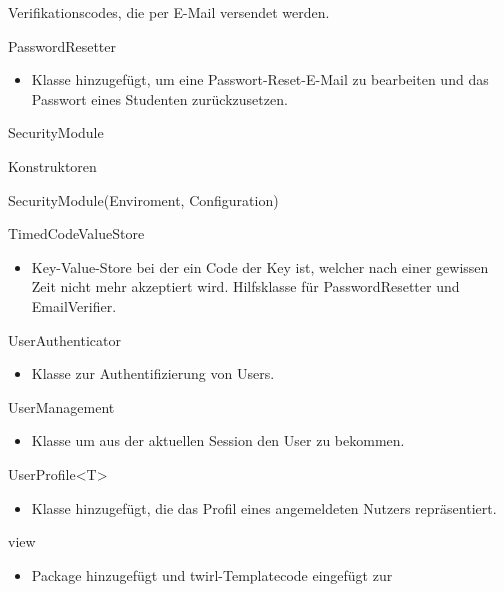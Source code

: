 \documentclass[parskip=full]{scrartcl}
\newcommand{\code}[1]{{\ttfamily #1}}
\begin{document}
\begin{itemPackage}
\begin{itemClass}
\begin{itemize}
	  Verifikationscodes, die per E-Mail versendet werden.
	\end{itemize}
\item PasswordResetter
 \begin{itemize}
	  \item Klasse hinzugefügt, um eine Passwort-Reset-E-Mail zu bearbeiten und das
	  Passwort eines Studenten zurückzusetzen.
	\end{itemize}
\item SecurityModule
\begin{itemClassSub}
\item Konstruktoren
\begin{itemPlus}
\item SecurityModule(Enviroment, Configuration)
\end{itemPlus}
\end{itemClassSub}
\item TimedCodeValueStore
\item \begin{itemize}
	  \item Key-Value-Store bei der ein Code der Key ist, welcher nach einer
	  gewissen Zeit nicht mehr akzeptiert wird. Hilfsklasse für
	  \code{PasswordResetter} und \code{EmailVerifier}.
	\end{itemize}
\item UserAuthenticator
\item \begin{itemize}
	  \item Klasse zur Authentifizierung von \code{Users}.
	\end{itemize}
\item UserManagement
\item \begin{itemize}
	  \item Klasse um aus der aktuellen Session den \code{User} zu bekommen.
	\end{itemize}
\item UserProfile<T>
\item \begin{itemize}
	  \item Klasse hinzugefügt, die das Profil eines angemeldeten Nutzers
	  repräsentiert.
	\end{itemize}
\end{itemClass}
\item view
\begin{itemize}
  \item Package hinzugefügt und \code{twirl}-Templatecode eingefügt zur

\end{itemize}
\end{itemPackage}
\end{document}
